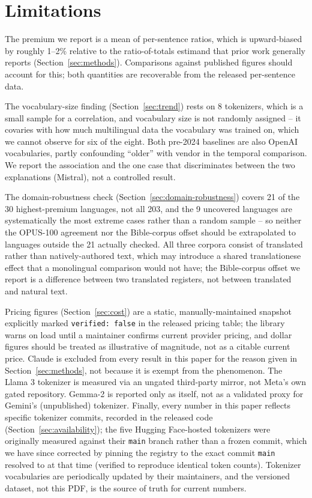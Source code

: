 \documentclass[11pt]{article}
\begin{document}
\section{Limitations}

The premium we report is a mean of per-sentence ratios, which is
upward-biased by roughly 1--2\% relative to the ratio-of-totals estimand
that prior work generally reports (Section~\ref{sec:methods}). Comparisons
against published figures should account for this; both quantities are
recoverable from the released per-sentence data.

The vocabulary-size finding (Section~\ref{sec:trend}) rests on 8 tokenizers,
which is a small sample for a correlation, and vocabulary size is not
randomly assigned -- it covaries with how much multilingual data the
vocabulary was trained on, which we cannot observe for six of the eight.
Both pre-2024 baselines are also OpenAI vocabularies, partly confounding
``older'' with vendor in the temporal comparison. We report the association
and the one case that discriminates between the two explanations (Mistral),
not a controlled result.

The domain-robustness check (Section~\ref{sec:domain-robustness}) covers 21
of the 30 highest-premium languages, not all 203, and the 9 uncovered
languages are systematically the most extreme cases rather than a random
sample -- so neither the OPUS-100 agreement nor the Bible-corpus offset
should be extrapolated to languages outside the 21 actually checked. All
three corpora consist of translated rather than natively-authored text,
which may introduce a shared translationese effect that a monolingual
comparison would not have; the Bible-corpus offset we report is a difference
between two translated registers, not between translated and natural text.

Pricing figures (Section~\ref{sec:cost}) are a static, manually-maintained
snapshot explicitly marked \texttt{verified: false} in the released pricing
table; the library warns on load until a maintainer confirms current
provider pricing, and dollar figures should be treated as illustrative of
magnitude, not as a citable current price. Claude is excluded from every
result in this paper for the reason given in Section~\ref{sec:methods}, not
because it is exempt from the phenomenon. The Llama 3 tokenizer is measured
via an ungated third-party mirror, not Meta's own gated repository. Gemma-2
is reported only as itself, not as a validated proxy for Gemini's
(unpublished) tokenizer. Finally, every number in this paper reflects
specific tokenizer commits, recorded in the released code
(Section~\ref{sec:availability}); the five Hugging Face-hosted tokenizers
were originally measured against their \texttt{main} branch rather than a
frozen commit, which we have since corrected by pinning the registry to the
exact commit \texttt{main} resolved to at that time (verified to reproduce
identical token counts). Tokenizer vocabularies are periodically updated by
their maintainers, and the versioned dataset, not this PDF, is the source
of truth for current numbers.
\end{document}
